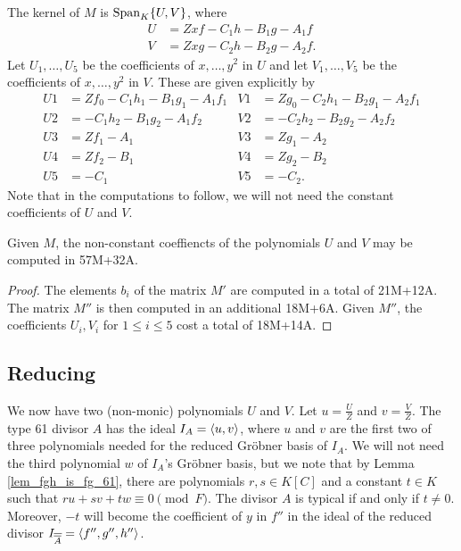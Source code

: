 The kernel of $M$ is $\operatorname{Span}_K\{U,V\}$, where
\begin{align*}
  U &= Zxf - C_1h - B_1g - A_1f \\
  V &= Zxg - C_2h - B_2g - A_2f.
\end{align*}
Let $U_1, \ldots, U_5$ be the coefficients of $x, \ldots, y^2$ in $U$
and let $V_1, \ldots, V_5$ be the coefficients of $x, \ldots, y^2$ in $V$.
These are given explicitly by
\begin{align*}
  U1 &= Zf_0 - C_1h_1 - B_1g_1 - A_1f_1 & V1 &= Zg_0 - C_2h_1 - B_2g_1 - A_2f_1 \\
  U2 &=      - C_1h_2 - B_1g_2 - A_1f_2 & V2 &=      - C_2h_2 - B_2g_2 - A_2f_2 \\
  U3 &= Zf_1 - A_1 & V3 &= Zg_1 - A_2 \\
  U4 &= Zf_2 - B_1 & V4 &= Zg_2 - B_2 \\
  U5 &=      - C_1 & V5 &=      - C_2.
\end{align*}
Note that in the computations to follow, we will not need the constant coefficients of $U$ and $V$.

\begin{lemma}
  Given $M$, the non-constant coeffiencts of the polynomials $U$ and $V$ may be computed in 57M+32A.
\end{lemma}
\begin{proof}
  The elements $b_i$ of the matrix $M'$ are computed in a total of 21M+12A.
  The matrix $M''$ is then computed in an additional 18M+6A.
  Given $M''$, the coefficients $U_i, V_i$ for $1 \leq i \leq 5$ cost a total of 18M+14A.
\end{proof}




\subsection{Reducing}

We now have two (non-monic) polynomials $U$ and $V$.
Let $u = \frac U Z$ and $v = \frac V Z$.
The type 61 divisor $A$ has the ideal $I_A = \left\langle u, v \right\rangle$,
where $u$ and $v$ are the first two of three polynomials needed for the reduced Gr\"obner basis of $I_A$.
We will not need the third polynomial $w$ of $I_A$'s Gr\"obner basis,
but we note that by Lemma \ref{lem_fgh_is_fg_61},
there are polynomials $r,s \in K[C]$ and a constant $t \in K$
such that $ru + sv + tw \equiv 0 \pmod F$.
The divisor $A$ is typical if and only if $t \neq 0$.
Moreover, $-t$ will become the coefficient of $y$ in $f''$ in the ideal of the reduced divisor
$I_{\overline{\overline{A}}} = \left\langle f'', g'', h'' \right\rangle$.

